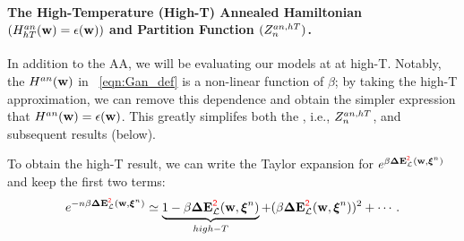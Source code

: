\paragraph{The High-Temperature (High-T) Annealed Hamiltonian $(\HANHT(\WVEC)=\EPSLw)$ and Partition Function $(\ZANHT)$. }
In addition to the AA, we will be evaluating our models at at high-T.
Notably, the \AnnealedHamiltonian $\HAN(\WVEC)$ in \EQN~\ref{eqn:Gan_def} is a non-linear function of $\beta$; by
taking the high-T approximation, we can remove this dependence and obtain
the simpler expression that $\HAN(\WVEC)=\EPSLw$.  This greatly simplifes both
the \PartitionFunction, i.e.,  $\ZANHT$, and subsequent results (below).


To obtain the high-T result, we can write the Taylor expansion for $e^{\beta\DETOPXI}$ and keep
the first two terms:
\begin{align}
  e^{-n\beta\DETOPXI} \simeq \underbrace{1 - \beta\DETOPXI}_{high-T}+ (\beta\DETOPXI)^{2} + \cdots  .
\end{align}


